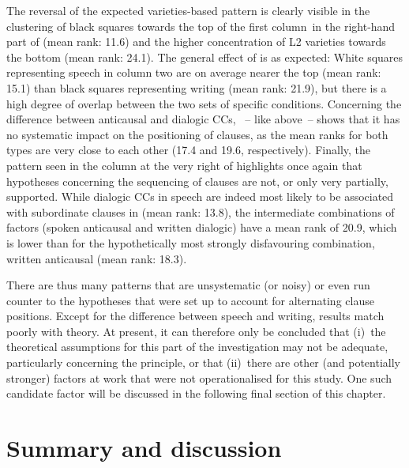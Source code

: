 The reversal of the expected varieties-based pattern is clearly visible in the clustering of black squares towards the top of the first column~in the right-hand part of  (mean rank: 11.6) and the higher concentration of L2 varieties towards the bottom (mean rank: 24.1). The general effect of  is as expected: White squares representing speech in column two are on average nearer the top (mean rank: 15.1) than black squares representing writing (mean rank: 21.9), but there is a high degree of overlap between the two sets of specific conditions. Concerning the difference between anticausal and dialogic CCs, ~– like  above~– shows that it has no systematic impact on the positioning of clauses, as the mean ranks for both types are very close to each other (17.4 and 19.6, respectively). Finally, the pattern seen in the column at the very right of  highlights once again that hypotheses concerning the sequencing of clauses are not, or only very partially, supported. While dialogic CCs in speech are indeed most likely to be associated with subordinate clauses in  (mean rank: 13.8), the intermediate combinations of factors (spoken anticausal and written dialogic) have a mean rank of 20.9, which is lower than for the hypothetically most strongly disfavouring combination, written anticausal (mean rank: 18.3).

There are thus many patterns that are unsystematic (or noisy) or even run counter to the hypotheses that were set up to account for alternating clause positions. Except for the difference between speech and writing, results match poorly with theory. At present, it can therefore only be concluded that
(i)~the theoretical assumptions for this part of the investigation may not be adequate, particularly concerning the  principle, or that
(ii)~there are other (and potentially stronger) factors at work that were not operationalised for this study. One such candidate factor will be discussed in the following final section of this chapter.

\section{\label{bkm:Ref51055521}Summary and discussion}\label{sec:9.3}

